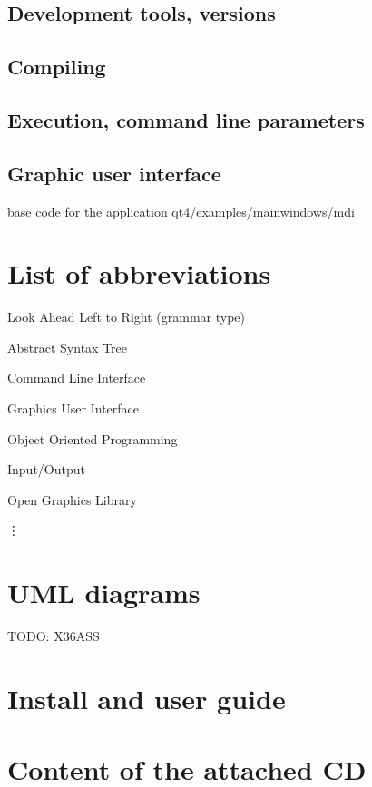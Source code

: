 \documentclass[11pt,twoside,a4paper]{book}
\begin{document}
\section{Development tools, versions}
\section{Compiling}
\section{Execution, command line parameters}
\section{Graphic user interface}

base code for the application qt4/examples/mainwindows/mdi



\chapter{List of abbreviations}
\begin{description}
\setlength{\labelwidth}{2.5cm}
\setlength{\itemindent}{1.5cm}
\item[LALR] Look Ahead Left to Right (grammar type)
\item[AST] Abstract Syntax Tree
\item[CLI] Command Line Interface
\item[GUI] Graphics User Interface
\item[OOP] Object Oriented Programming
\item[I/O] Input/Output
\item[OpenGL] Open Graphics Library
\end{description}
\vdots



\chapter{UML diagrams}

TODO: X36ASS



\chapter{Install and user guide}



\chapter{Content of the attached CD}
\end{document}
